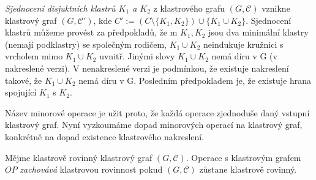 \begin{defn}
\textit{Sjednocení disjuktních klastrů $K_1$ a $K_2$} z klastrového grafu $(G, \mathcal C)$ vznikne klastrový graf  $(G, \mathcal C')$, kde $C'  := (C\setminus \{K_1,K_2\}) \cup \{K_1 \cup K_2\}$. Sjednocení klastrů můžeme provést za předpokladů, že m $K_1, K_2$ jsou dva minimální klastry (nemají podklastry) se společným rodičem, $K_1 \cup K_2$ neindukuje kružnici s vrcholem mimo $K_1 \cup K_2$ uvnitř. Jinými slovy $K_1 \cup K_2$ nemá díru v G (v nakreslené verzi). V nenakreslené verzi je podmínkou, že existuje nakreslení takové, že $K_1 \cup K_2$ nemá díru v G. Posledním předpokladem je, že existuje hrana spojující $K_1$ s $K_2$.
\end{defn}

Název minorové operace je užit proto, že každá operace zjednoduše daný vstupní klastrový graf.
Nyní vyzkoumáme dopad minorových operací na klastrový graf, konkrétně na dopad existence klastrového nakreslení.

\begin{defn}
Mějme klastrově rovinný klastrový graf $(G, \mathcal C)$. Operace s klastrovým grafem $OP$ \textit{zachovává} klastrovou rovinnost pokud $(G, \mathcal C)$ zůstane klastrově rovinný.
\end{defn}


